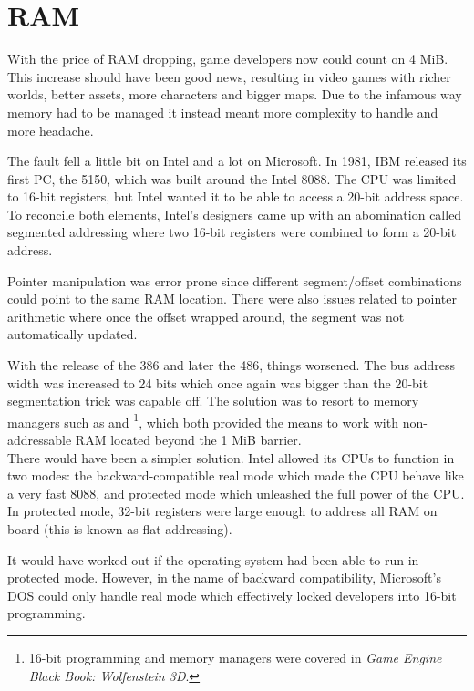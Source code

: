 \section{RAM}
With the price of RAM dropping, game developers now could count on 4 MiB. This increase should have been good news, resulting in video games with richer worlds, better assets, more characters and bigger maps. Due to the infamous way memory had to be managed it instead meant more complexity to handle and more headache.\\
\par
The fault fell a little bit on Intel and a lot on Microsoft. In 1981, IBM released its first PC, the 5150, which was built around the Intel 8088. The CPU was limited to 16-bit registers, but Intel wanted it to be able to access a 20-bit address space. To reconcile both elements, Intel's designers came up with an abomination called segmented addressing where two 16-bit registers were combined to form a 20-bit address.\\
\par


\par
Pointer manipulation was error prone since different segment/offset combinations could point to the same RAM location. There were also issues related to pointer arithmetic where once the offset wrapped around, the segment was not automatically updated.\\
\par
With the release of the 386 and later the 486, things worsened. The bus address width was increased to 24 bits which once again was bigger than the 20-bit segmentation trick was capable off. The solution was to resort to memory managers such as  and \footnote{16-bit programming and memory managers were covered in \textit{Game Engine Black Book: Wolfenstein 3D}.}, which both provided the means to work with non-addressable RAM located beyond the 1 MiB barrier.\\

There would have been a simpler solution. Intel allowed its CPUs to function in two modes: the backward-compatible real mode which made the CPU behave like a very fast 8088, and protected mode which unleashed the full power of the CPU. In protected mode, 32-bit registers were large enough to address all RAM on board (this is known as flat addressing).\\
\par
It would have worked out if the operating system had been able to run in protected mode. However, in the name of backward compatibility, Microsoft's DOS could only handle real mode which effectively locked developers into 16-bit programming.\\ 
\par




